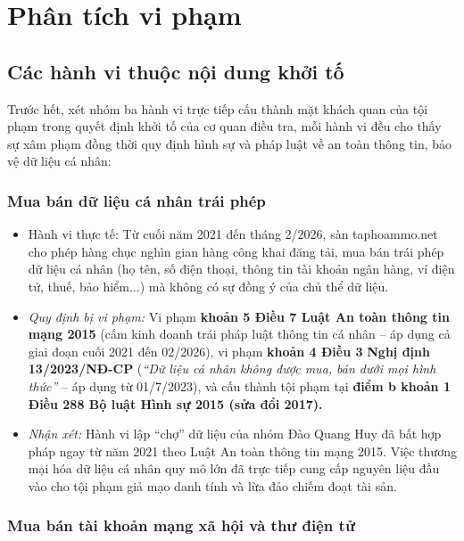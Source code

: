 \section{Phân tích vi phạm}\label{sec:3}

\subsection{Các hành vi thuộc nội dung khởi tố}\label{sec:3.1}

Trước hết, xét nhóm ba hành vi trực tiếp cấu thành mặt khách quan của tội phạm trong quyết định khởi tố của cơ quan điều tra, mỗi hành vi đều cho thấy sự xâm phạm đồng thời quy định hình sự và pháp luật về an toàn thông tin, bảo vệ dữ liệu cá nhân:

\subsubsection{Mua bán dữ liệu cá nhân trái phép}\label{sec:3.1.1}

\begin{itemize}
\item Hành vi thực tế: Từ cuối năm 2021 đến tháng 2/2026, sàn taphoammo.net cho phép hàng chục nghìn gian hàng công khai đăng tải, mua bán trái phép dữ liệu cá nhân (họ tên, số điện thoại, thông tin tài khoản ngân hàng, ví điện tử, thuế, bảo hiểm...) mà không có sự đồng ý của chủ thể dữ liệu.
\item \textit{Quy định bị vi phạm:} Vi phạm \textbf{khoản 5 Điều 7 Luật An toàn thông tin mạng 2015} (cấm kinh doanh trái pháp luật thông tin cá nhân – áp dụng cả giai đoạn cuối 2021 đến 02/2026), vi phạm \textbf{khoản 4 Điều 3} \textbf{Nghị định 13/2023/NĐ-CP} (\textit{“Dữ liệu cá nhân không được mua, bán dưới mọi hình thức”} – áp dụng từ 01/7/2023), và cấu thành tội phạm tại \textbf{điểm b khoản 1 Điều 288 Bộ luật Hình sự 2015 (sửa đổi 2017).}
\item \textit{Nhận xét:} Hành vi lập “chợ” dữ liệu của nhóm Đào Quang Huy đã bất hợp pháp ngay từ năm 2021 theo Luật An toàn thông tin mạng 2015. Việc thương mại hóa dữ liệu cá nhân quy mô lớn đã trực tiếp cung cấp nguyên liệu đầu vào cho tội phạm giả mạo danh tính và lừa đảo chiếm đoạt tài sản.
\end{itemize}
\subsubsection{Mua bán tài khoản mạng xã hội và thư điện tử}\label{sec:3.1.2}

